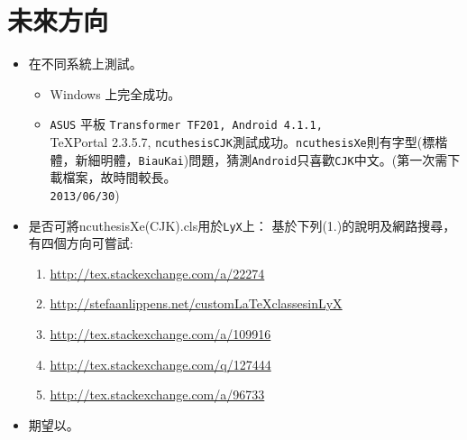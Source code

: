 \section{未來方向}
\begin{itemize}
\item 在不同系統上測試。
\begin{itemize}
\item Windows 上完全成功。
\item {\tt ASUS} 平板 {\tt Transformer TF201, Android 4.1.1,} \\
\TeX Portal 2.3.5.7, {\tt ncuthesisCJK}測試成功。{\tt ncuthesisXe}則有字型(標楷體，新細明體，{\tt BiauKai})問題，猜測{\tt Android}只喜歡{\tt CJK}中文。(第一次需下載檔案，故時間較長。\\
{\tt 2013/06/30})
\end{itemize}
\item 是否可將ncuthesisXe(CJK).cls用於{\tt LyX}上： 基於下列(1.)的說明及網路搜尋，有四個方向可嘗試:  \index{\TeX!}
\begin{enumerate}
\item \url{http://tex.stackexchange.com/a/22274}
\item \url{http://stefaanlippens.net/customLaTeXclassesinLyX}
\item \url{http://tex.stackexchange.com/a/109916}
\item \url{http://tex.stackexchange.com/q/127444}
\item \url{http://tex.stackexchange.com/a/96733}
\end{enumerate}
\item 期望以。
\end{itemize}
\null\vfil
